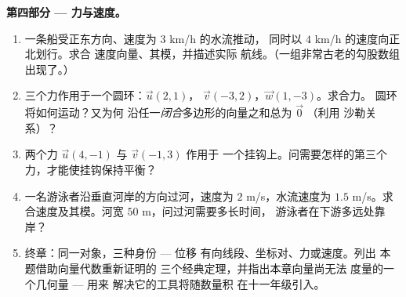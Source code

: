 \begin{problem}
\medskip
\noindent\textbf{第四部分 --- 力与速度。}
\begin{enumerate}[resume]
  \item 一条船受正东方向、速度为 $3$ km/h 的水流推动，
        同时以 $4$ km/h 的速度向正北划行。求合
        速度向量、其模，并描述实际
        航线。（一组非常古老的勾股数组出现了。）
  \item 三个力作用于一个圆环：$\vec u(2, 1)$，
        $\vec v(-3, 2)$，$\vec w(1, -3)$。求合力。
        圆环将如何运动？又为何
        沿任一\emph{闭合}多边形的向量之和总为 $\vec 0$
        （利用 沙勒关系）？
  \item 两个力 $\vec u(4, -1)$ 与 $\vec v(-1, 3)$ 作用于
        一个挂钩上。问需要怎样的第三个力，才能使挂钩保持平衡？
  \item 一名游泳者沿垂直河岸的方向过河，速度为
        $2$ m/s，水流速度为 $1.5$ m/s。求
        合速度及其模。河宽
        $50$ m，问过河需要多长时间，
        游泳者在下游多远处靠岸？
  \item 终章：同一对象，三种身份 --- 位移
        有向线段、坐标对、力或速度。列出
        本题借助向量代数重新证明的
        三个经典定理，并指出本章向量尚无法
        度量的一个几何量 --- 用来
        解决它的工具将随数量积
        在十一年级引入。
\end{enumerate}
\end{problem}
